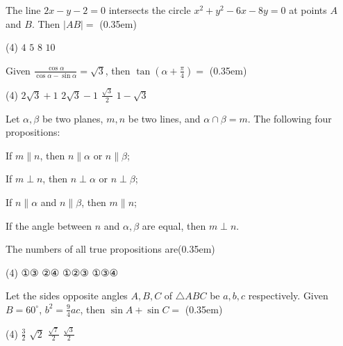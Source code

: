 \documentclass[UTF8,12pt]{ctexart}
\begin{document}
\begin{questions}
  \item The line $2x - y - 2 = 0$ intersects the circle $x^{2} + y^{2} - 6x - 8y = 0$ at
    points $A$ and $B$. Then $|AB| =$ \mbox{(\kern0.35em)}

    \begin{tasks}(4)
      \task $4$
      \task $5$
      \task $8$
      \task $10$
    \end{tasks}

  \item Given $\frac{\cos\alpha}{\cos\alpha-\sin\alpha}=\sqrt{3}$, then
    $\tan\left(\alpha+\frac{\pi}{4}\right)=$ \mbox{(\kern0.35em)}

    \begin{tasks}(4)
      \task $2\sqrt{3}+1$
      \task $2\sqrt{3}-1$
      \task $\frac{\sqrt{3}}{2}$
      \task $1-\sqrt{3}$
    \end{tasks}

  \item Let $\alpha, \beta$ be two planes, $m, n$ be two lines, and
    $\alpha \cap \beta = m$. The following four propositions:

    \begin{statements}
      \item[①] If $m \parallel n$, then $n \parallel \alpha$ or $n \parallel \beta$;
      \item[②] If $m \perp n$, then $n \perp \alpha$ or $n \perp \beta$;
      \item[③] If $n \parallel \alpha$ and $n \parallel \beta$, then $m \parallel n$;
      \item[④] If the angle between $n$ and $\alpha, \beta$ are equal, then $m \perp n$.
    \end{statements}

  The numbers of all true propositions are\mbox{(\kern0.35em)}

    \begin{tasks}(4)
      \task ①③
      \task ②④
      \task ①②③
      \task ①③④
    \end{tasks}

  \item Let the sides opposite angles $A, B, C$ of $\triangle ABC$ be $a, b, c$
    respectively. Given $B = 60^{\circ}$, $b^{2} = \frac{9}{4}ac$, then
    $\sin A + \sin C =$ \mbox{(\kern0.35em)}

    \begin{tasks}(4)
      \task $\frac{3}{2}$
      \task $\sqrt{2}$
      \task $\frac{\sqrt{7}}{2}$
      \task $\frac{\sqrt{3}}{2}$
    \end{tasks}

\end{questions}
\end{document}
